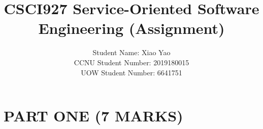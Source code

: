 \documentclass[runningheads]{llncs}
\begin{document}
\title{\large{CSCI927 Service-Oriented Software Engineering (Assignment)}}

%
%
\author{\large{Student Name: Xiao Yao \\ %
CCNU Student Number: 2019180015 \\ %
UOW Student Number: 6641751}}  %







\maketitle



\section{PART ONE (7 MARKS)}
\end{document}
